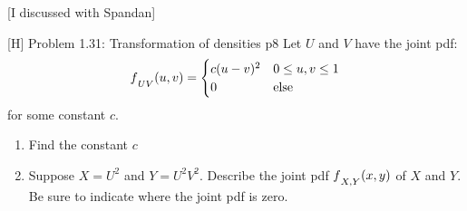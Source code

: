 \documentclass[a4paper, 11pt]{article}
\begin{document}
[I discussed with Spandan]



\begin{problem}{%
		[H] Problem 1.31: Transformation of densities
	}{p8%
	}
	Let $U$ and $V$ have the joint pdf: $$f\strut_{UV}(u,v)=\begin{cases}
		c(u-v)^2 & 0\leq u,v\leq 1\\ 0 & \text{else}
	\end{cases}$$for some constant $c$.
\begin{enumerate}[label=(\alph*)]
	\item Find the constant $c$
	\item Suppose $X=U^2$ and $Y=U^2V^2$. Describe the joint pdf $f\strut_{X,Y}(x,y)$ of $X$ and $Y$. Be sure to indicate where the joint pdf is zero.
\end{enumerate}
\end{problem}
\end{document}
